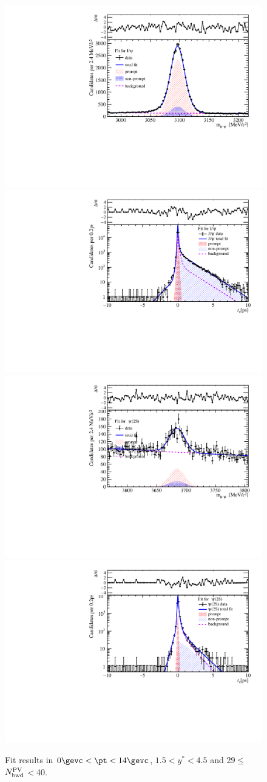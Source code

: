 \begin{figure}[H]
\begin{center}
\includegraphics[width=0.45\linewidth]{pdf/pPb/BWorkdir/TwoDimFit/ProjMass/Jpsi_n3y1pt1.pdf}
\includegraphics[width=0.45\linewidth]{pdf/pPb/BWorkdir/TwoDimFit/ProjTz/Jpsi_n3y1pt1.pdf}
\vspace*{-0.5cm}
\includegraphics[width=0.45\linewidth]{pdf/pPb/BWorkdir/TwoDimFit/ProjMass/Psi2S_n3y1pt1.pdf}
\includegraphics[width=0.45\linewidth]{pdf/pPb/BWorkdir/TwoDimFit/ProjTz/Psi2S_n3y1pt1.pdf}
\vspace*{-0.5cm}
\end{center}
\caption{Fit results in $0\gevc<\pt<14\gevc$, $1.5<y^*<4.5$ and 29$\leq$$N_{\rm bwd}^{\rm PV}$$<$40.}
\end{figure}
